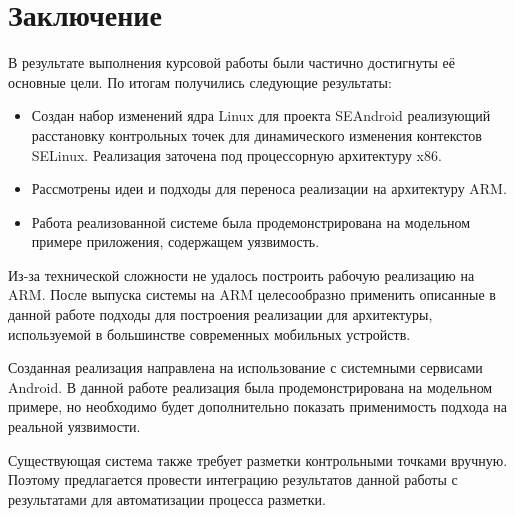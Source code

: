 \newpage
\section{Заключение}

В результате выполнения курсовой работы были частично достигнуты её
основные цели. По итогам получились следующие результаты:

\begin{itemize}

    \item Создан набор изменений ядра Linux для проекта SEAndroid
        реализующий расстановку контрольных точек для динамического
        изменения контекстов SELinux. Реализация заточена под
        процессорную архитектуру x86.

    \item Рассмотрены идеи и подходы для переноса реализации на
        архитектуру ARM.

    \item Работа реализованной системе была продемонстрирована на
        модельном примере приложения, содержащем уязвимость.

\end{itemize}

Из-за технической сложности не удалось построить рабочую реализацию на
ARM. После выпуска системы \cite{uprobes} на ARM целесообразно применить
описанные в данной работе подходы для построения реализации для
архитектуры, используемой в большинстве современных мобильных устройств.

Созданная реализация направлена на использование с системными сервисами
Android. В данной работе реализация была продемонстрирована на модельном
примере, но необходимо будет дополнительно показать применимость подхода
на реальной уязвимости. 

Существующая система также требует разметки контрольными точками
вручную. Поэтому предлагается провести интеграцию результатов данной
работы с результатами \cite{mso} для автоматизации процесса разметки.

\newpage

